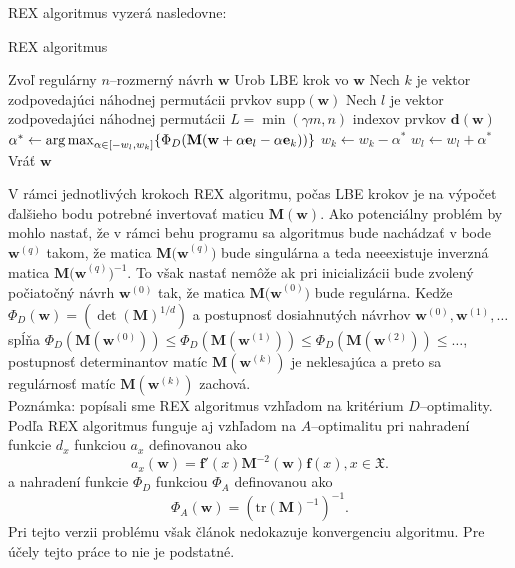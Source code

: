 REX algoritmus vyzerá nasledovne:

\begin{algorithm}[H]
	\caption{REX algoritmus \cite{rex_harman}}
	\label{rex}
	\begin{algorithmic}[1]
		\State Zvoľ regulárny $n$--rozmerný návrh $\mathbf w$
			\State Urob LBE krok vo $\mathbf w$
			\State Nech $k$ je vektor zodpovedajúci náhodnej permutácii prvkov supp$(\mathbf w)$
			\State Nech $l$ je vektor zodpovedajúci náhodnej permutácii $L=\min(\gamma m, n)$ indexov prvkov $\mathbf {d(w)}$
					\State $\alpha^* \leftarrow \operatorname*{arg\,max}_{\alpha \in [-w_l, w_k]} \{ \Phi_D(\mathbf M(\mathbf w+\alpha \mathbf e_l -\alpha \mathbf e_k))\}$
						\State $w_k \leftarrow w_k - \alpha^*$
						\State $w_l \leftarrow w_l + \alpha^*$
					\EndIf
				\EndFor
			\EndFor
		\EndWhile
		\State Vráť $\mathbf w$
	\end{algorithmic}
\end{algorithm}

V rámci jednotlivých krokoch REX algoritmu, počas LBE krokov je na výpočet ďalšieho bodu potrebné invertovať maticu $\mathbf{M(w)}$. Ako potenciálny problém by mohlo nastať, že v rámci behu programu sa algoritmus bude nachádzať v bode $\mathbf w^{(q)}$ takom, že matica  $\mathbf{M(w}^{(q)})$ bude singulárna a teda neeexistuje inverzná matica $\mathbf{M(w}^{(q)})^{-1}$. To však nastať nemôže ak pri inicializácii bude zvolený počiatočný návrh $\mathbf w^{(0)}$ tak, že matica $\mathbf{M(w}^{(0)})$ bude regulárna. Kedže $\Phi_D(\mathbf{w})=(\det(\mathbf{M})^{1/d})$ a postupnosť dosiahnutých návrhov $\mathbf w^{(0)}, \mathbf w^{(1)}, \dots$ spĺňa $ \Phi_D(\mathbf M(\mathbf w^{(0)})) \leq \Phi_D(\mathbf M(\mathbf w^{(1)})) \leq \Phi_D(\mathbf M(\mathbf w^{(2)})) \leq \dots$, postupnosť determinantov matíc $\mathbf M(\mathbf w^{(k)})$ je neklesajúca a preto sa regulárnosť matíc $\mathbf M(\mathbf w^{(k)})$ zachová.\\

Poznámka: popísali sme REX algoritmus vzhľadom na kritérium $D$--optimality. Podľa \cite{rex_harman} REX algoritmus funguje aj vzhľadom na $A$--optimalitu pri nahradení funkcie $d_x$ funkciou $a_x$ definovanou ako $$a_x(\mathbf w)=\mathbf {f'}(x)\mathbf M^{-2}(\mathbf w)\mathbf f(x), x \in \mathfrak X.$$ a nahradení funkcie $\Phi_D$ funkciou $\Phi_A$ definovanou ako $$\Phi_A(\mathbf{w})=(\text{tr}(\mathbf M)^{-1})^{-1}.$$ Pri tejto verzii problému však článok \cite{rex_harman} nedokazuje konvergenciu algoritmu. Pre účely tejto práce to nie je podstatné.
